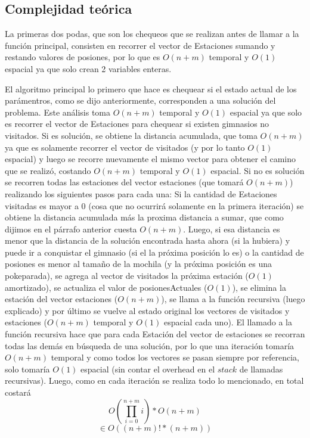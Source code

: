     \subsection{Complejidad teórica}

      La primeras dos podas, que son los chequeos que se realizan antes de llamar a la función principal, consisten en recorrer el vector de Estaciones sumando y restando valores de posiones, por lo que es $O(n+m)$ temporal y $O(1)$ espacial ya que solo crean 2 variables enteras.

      El algoritmo principal lo primero que hace es chequear si el estado actual de los parámentros, como se dijo anteriormente, corresponden a una solución del problema. Este análisis toma $O(n+m)$ temporal y $O(1)$ espacial ya que solo es recorrer el vector de Estaciones para chequear si existen gimnasios no visitados. Si es solución, se obtiene la distancia acumulada, que toma $O(n+m)$ ya que es solamente recorrer el vector de visitados (y por lo tanto $O(1)$ espacial) y luego se recorre nuevamente el mismo vector para obtener el camino que se realizó, costando $O(n+m)$ temporal y $O(1)$ espacial.
      Si no es solución se recorren todas las estaciones del vector estaciones (que tomará $O(n+m)$) realizando los siguientes pasos para cada una: Si la cantidad de Estaciones visitadas es mayor a 0 (cosa que no ocurrirá solamente en la primera iteración) se obtiene la distancia acumulada más la proxima distancia a sumar, que como dijimos en el párrafo anterior cuesta $O(n+m)$. Luego, si esa distancia es menor que la distancia de la solución encontrada hasta ahora (si la hubiera) y puede ir a conquistar el gimnasio (si el la próxima posición lo es) o la cantidad de posiones es menor al tamaño de la mochila (y la próxima posición es una pokeparada), se agrega al vector de visitados la próxima estación ($O(1)$ amortizado), se actualiza el valor de posionesActuales ($O(1)$), se elimina la estación del vector estaciones ($O(n+m)$), se llama a la función recursiva (luego explicado) y por último se vuelve al estado original los vectores de visitados y estaciones ($O(n+m)$ temporal y $O(1)$ espacial cada uno).
      El llamado a la función recursiva hace que para cada Estación del vector de estaciones se recorran todas las demás en búsqueda de una solución, por lo que una iteración tomaría $O(n+m)$ temporal y como todos los vectores se pasan siempre por referencia, solo tomaría $O(1)$ espacial (sin contar el overhead en el $stack$ de llamadas recursivas). Luego, como en cada iteración se realiza todo lo mencionado, en total costará
      \[
        O(\prod_{i=0}^{n+m} i)*O(n+m)
      \]
      \[
        \in O((n+m)! * (n+m))
      \]

